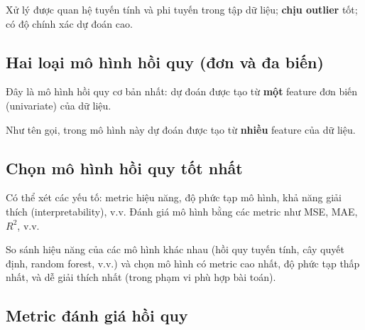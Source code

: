 \begin{tinhchat}[title={Ưu điểm}]
Xử lý được quan hệ tuyến tính và phi tuyến trong tập dữ liệu; \textbf{chịu outlier} tốt; có độ chính xác dự đoán cao.
\end{tinhchat}

\subsection{Hai loại mô hình hồi quy (đơn và đa biến)}

\begin{dinhnghia}[title={Mô hình hồi quy đơn (Simple regression model)}]
Đây là mô hình hồi quy cơ bản nhất: dự đoán được tạo từ \textbf{một} feature đơn biến (univariate) của dữ liệu.
\end{dinhnghia}

\begin{dinhnghia}[title={Mô hình hồi quy đa biến (Multiple regression model)}]
Như tên gọi, trong mô hình này dự đoán được tạo từ \textbf{nhiều} feature của dữ liệu.
\end{dinhnghia}

\subsection{Chọn mô hình hồi quy tốt nhất}

\begin{phuongphap}[title={Cách chọn mô hình}]
Có thể xét các yếu tố: metric hiệu năng, độ phức tạp mô hình, khả năng giải thích (interpretability), v.v.
Đánh giá mô hình bằng các metric như MSE, MAE, $R^2$, v.v.

So sánh hiệu năng của các mô hình khác nhau (hồi quy tuyến tính, cây quyết định, random forest, v.v.) và chọn mô hình có metric cao nhất, độ phức tạp thấp nhất, và dễ giải thích nhất (trong phạm vi phù hợp bài toán).
\end{phuongphap}

\subsection{Metric đánh giá hồi quy}


